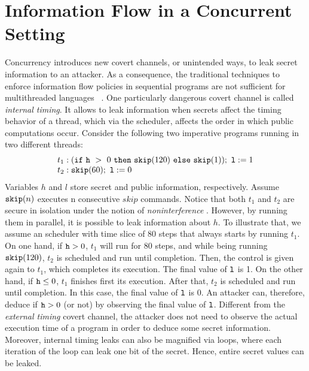 \documentclass[times, 10pt,twocolumn]{article}
\begin{document}
\section{Information Flow in a Concurrent Setting}
\label{sec:concurrency}
Concurrency introduces new covert channels, or unintended
ways, to leak secret information to an attacker. As a consequence, 
the traditional techniques to enforce information flow policies in
sequential programs are not sufficient for multithreaded languages
~\cite{Smith:Volpano:MultiThreaded}. One particularly dangerous
covert channel is called \emph{internal timing}. It allows 
to leak information when secrets affect the timing behavior of
a thread, which via the scheduler, affects the order in which public 
computations occur. Consider the following two 
imperative programs running in two different threads:
%
\begin{equation}
 \begin{array}{l}
t_1:(\mathtt{if}~\mathtt{h}~>~0~\mathtt{then}~\mathtt{skip}(120)~\mathtt{else}~\mathtt{skip}(1));~\mathtt{l}:=1 \\
t_2:\mathtt{skip}(60);~\mathtt{l}:=0
 \end{array}
\label{attack:example}
\end{equation}
%
Variables $h$ and $l$ store secret and public information,
respectively. 
Assume $\mathtt{skip}(n)$ executes n consecutive $skip$ commands.
Notice that both $t_1$ and $t_2$ are secure in isolation under the
notion of {\em noninterference} \cite{Sabelfeld:Myers:JSAC}.
However, by running them in parallel, it is possible to leak
information about $h$. To illustrate that, we assume 
an scheduler with time slice of 80 steps that  
always starts by running $t_1$.
On one hand, if $\mathtt{h}>0$, $t_1$ will run for $80$ steps, and
while being running $\mathtt{skip}(120)$, $t_2$ is scheduled and 
run until completion. Then, the control is given again to 
$t_1$, which completes its execution. The final value of $\mathtt{l}$
is 1. On the other hand, if $\mathtt{h}\leq 0$, $t_1$ finishes first  
its execution. After that,  $t_2$ is scheduled and run until completion. In
this case, the final value of $\mathtt{l}$ is 0. An attacker can,
therefore, deduce if $\mathtt{h}>0$ (or not) by observing the final
value of $\mathtt{l}$. 
%
Different from the \emph{external timing} covert channel, the attacker does
not need to observe the actual execution time of a program in order to 
deduce some secret information. Moreover, internal timing leaks
can also be magnified via loops, where each
iteration of the loop can leak one bit of the secret. Hence, 
entire secret values can be leaked.
\end{document}
